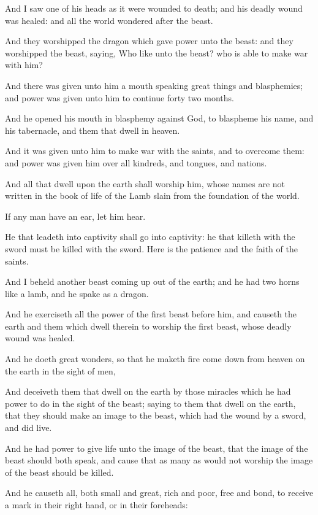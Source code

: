{And I
saw
one of
his
heads as it
were
wounded
to
death;
and
his
deadly
wound was
healed:
and
all the
world
wondered
after the
beast.

And they
worshipped the
dragon
which
gave
power unto the
beast:
and they
worshipped the
beast,
saying,
Who
{} like
unto the
beast?
who is
able to make
war
with
him?

And there was
given unto
him a
mouth
speaking great
things
and
blasphemies;
and
power was
given unto
him to
continue
forty
{}
two
months.

And he
opened
his
mouth
in
blasphemy
against
God, to
blaspheme
his
name,
and
his
tabernacle,
and
them that
dwell
in
heaven.

And it was
given unto
him to
make
war
with the
saints,
and to
overcome
them:
and
power was
given
him
over
all
kindreds,
and
tongues,
and
nations.

And
all
that
dwell
upon the
earth shall
worship
him,
whose
names
are
not
written
in the
book of
life of the
Lamb
slain
from the
foundation of the
world.

If any
man
have an
ear, let him
hear.

He
that leadeth
into
captivity shall
go
into
captivity:
he
that
killeth
with the
sword
must
be
killed
with the
sword.
Here
is the
patience
and the
faith of the
saints.

And I
beheld
another
beast coming
up out
of the
earth;
and he
had
two
horns
like a
lamb,
and he
spake
as a
dragon.

And he
exerciseth
all the
power of the
first
beast
before
him,
and
causeth the
earth
and
them which
dwell
therein
to
worship the
first
beast,
whose
deadly
wound was
healed.

And he
doeth
great
wonders,
so
that he
maketh
fire come
down
from
heaven
on the
earth in the
sight of
men,

And
deceiveth
them that
dwell
on the
earth
by
{}
those
miracles
which
he had
power to
do in the sight
of the
beast;
saying to
them that
dwell
on the
earth, that they should
make an
image to the
beast,
which
had the
wound by a
sword,
and did
live.

And
he had
power to
give
life unto the
image of the
beast,
that the
image of the
beast
should
both
speak,
and
cause
that as
many
as
would
not
worship the
image of the
beast should be
killed.

And he
causeth
all,
both
small
and
great,
rich
and
poor,
free
and
bond,
to
receive a
mark
in
their
right
hand,
or
in
their
foreheads:

}
